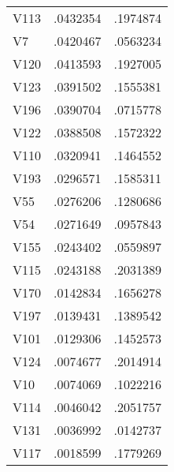 \begin{tabularx}{\linewidth}{@{}lCC@{}}
V113&.0432354&.1974874 \tabularnewline
V7&.0420467&.0563234 \tabularnewline
V120&.0413593&.1927005 \tabularnewline
V123&.0391502&.1555381 \tabularnewline
V196&.0390704&.0715778 \tabularnewline
V122&.0388508&.1572322 \tabularnewline
V110&.0320941&.1464552 \tabularnewline
V193&.0296571&.1585311 \tabularnewline
V55&.0276206&.1280686 \tabularnewline
V54&.0271649&.0957843 \tabularnewline
V155&.0243402&.0559897 \tabularnewline
V115&.0243188&.2031389 \tabularnewline
V170&.0142834&.1656278 \tabularnewline
V197&.0139431&.1389542 \tabularnewline
V101&.0129306&.1452573 \tabularnewline
V124&.0074677&.2014914 \tabularnewline
V10&.0074069&.1022216 \tabularnewline
V114&.0046042&.2051757 \tabularnewline
V131&.0036992&.0142737 \tabularnewline
V117&.0018599&.1779269 \tabularnewline
\bottomrule 

\end{tabularx}

